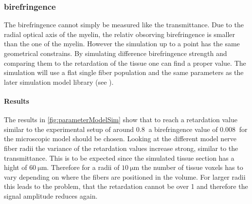 \subsubsection{birefringence}
%
The birefringence cannot simply be measured like the transmittance.
Due to the radial optical axis of the myelin, the relativ obsorving birefringence is smaller than the one of the myelin.
However the simulation up to a point has the same geometrical constrains.
By simulating difference birefringence strength and comparing them to the retardation of the tissue one can find a proper value.
The simulation will use a flat single fiber population and the same parameters as the later simulation model library (see \dummy{}).
%
\paragraph{Results}
The results in \cref{fig:parameterModelSim} show that to reach a retardation value similar to the experimental setup of around $\SI{0.8}{}$ a birefringence value of $\SI{0.008}{}$ for the microscopic model should be chosen.
Looking at the different model nerve fiber radii the variance of the retardation values increase strong, similar to the transmittance.
This is to be expected since the simulated tissue section has a hight of $\SI{60}{\micro\meter}$.
Therefore for a radii of $\SI{10}{\micro\meter}$ the number of tissue voxels has to vary depending on where the fibers are positioned in the volume.
For larger radii this leads to the problem, that the retardation cannot be over 1 and therefore the signal amplitude reduces again.
%
%
%
%
%
